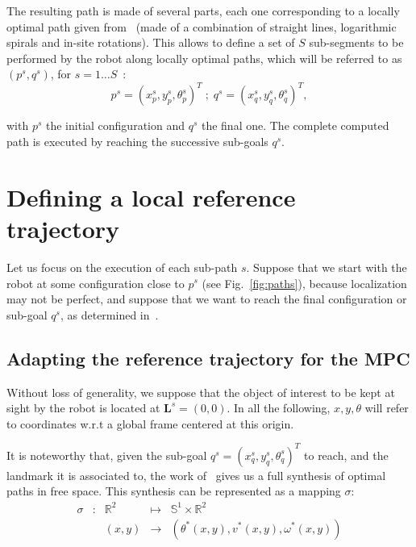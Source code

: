 The resulting path is made of several parts, each one corresponding to a locally optimal path given from~\cite{Salaris:2010} (made of a combination of straight lines, logarithmic spirals and in-site rotations). This allows to define a set of $S$ sub-segments to be performed by the robot along locally optimal paths, which will be referred to as $(p^s,q^s)$, for $s=1\dots S$~:
$$
p^s = (x_p^s,y_p^s,\theta_p^s)^T \; ; \; q^s = (x_q^s,y_q^s,\theta_q^s)^T,
$$

with $p^s$ the initial configuration and $q^s$ the final one. The complete computed path is executed by reaching the successive sub-goals $q^s$.


\section{Defining a local reference trajectory}

\label{sec:reftrajectories}

Let us focus on the execution of each sub-path $s$. Suppose that we start with the robot at some configuration close to $p^s$ (see Fig.~\ref{fig:paths}), because localization may not be perfect, and suppose that we want to reach the final configuration or sub-goal $q^s$, as determined in~\cite{jib-IJHR2010}.

\subsection{Adapting the reference trajectory for the MPC}

Without loss of generality, we suppose that the object of interest to be kept at sight by the robot is located at $\mathbf L^s = (0,0)$. In all the following, $x,y,\theta$ will refer to coordinates w.r.t a global frame centered at this origin.

It is noteworthy that, given the sub-goal $q^s =(x_q^s,y_q^s,\theta_q^s)^T$ to reach, and the landmark it is associated to, the work of~\cite{Salaris:2010} gives us a full synthesis of optimal paths in free space. This synthesis can be represented as a mapping $\sigma$:
$$
\begin{array}{cccccc}
\sigma & : & \mathbb{R}^2 & \mapsto & \mathbb{S}^1 \times \mathbb{R}^2\\
& & (x,y) & \rightarrow & (\theta^*(x,y),v^*(x,y),\omega^*(x,y))
\end{array}
$$

